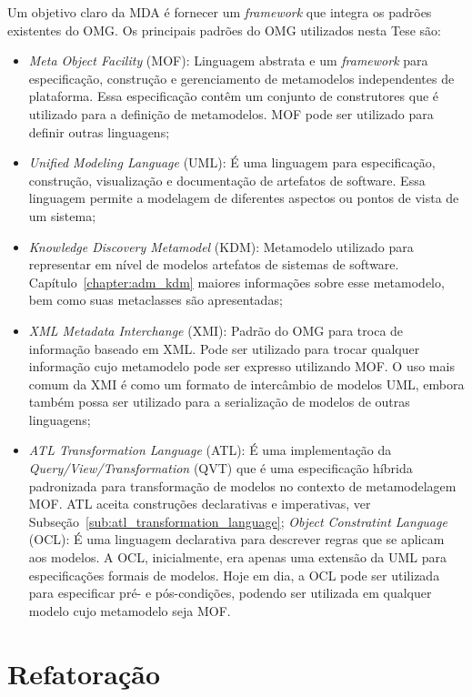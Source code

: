 Um objetivo claro da MDA é fornecer um \textit{framework} que integra os padrões existentes do OMG. Os principais padrões do OMG utilizados nesta Tese são:

\begin{itemize}
\item \textit{Meta Object Facility} (MOF): Linguagem abstrata e um \textit{framework} para especificação, construção e gerenciamento de metamodelos independentes de plataforma. Essa especificação contêm um conjunto de construtores que é utilizado para a definição de metamodelos. MOF pode ser utilizado para definir outras linguagens;
\item \textit{Unified Modeling Language} (UML): É uma linguagem para especificação, construção, visualização e documentação de artefatos de software. Essa linguagem permite a modelagem de diferentes aspectos ou pontos de vista de um sistema;
\item \textit{Knowledge Discovery Metamodel} (KDM): Metamodelo utilizado para representar em nível de modelos artefatos de sistemas de software. Capítulo~\ref{chapter:adm_kdm} maiores informações sobre esse metamodelo, bem como suas metaclasses são apresentadas;
\item \textit{XML Metadata Interchange} (XMI): Padrão do OMG para troca de informação baseado em XML. Pode ser utilizado para trocar qualquer informação cujo metamodelo pode ser expresso utilizando MOF. O uso mais comum da XMI é como um formato de intercâmbio de modelos UML, embora também possa ser utilizado para a serialização de modelos de outras linguagens;
\item \textit{ATL Transformation Language} (ATL): É uma implementação da \textit{Query/View/Transformation} (QVT) que é uma especificação híbrida padronizada para transformação de modelos no contexto de metamodelagem MOF. ATL aceita construções declarativas e imperativas, ver Subseção~\ref{sub:atl_transformation_language};
\textit{Object Constratint Language} (OCL): É uma linguagem declarativa para descrever regras que se aplicam aos modelos. A OCL, inicialmente, era apenas uma extensão da UML para especificações formais de modelos. Hoje em dia, a OCL pode ser utilizada para especificar pré- e pós-condições, podendo ser utilizada em qualquer modelo cujo metamodelo seja MOF.
\end{itemize}

\section{Refatoração}\label{sec:refatoracao}

